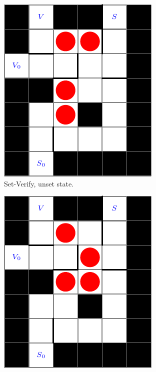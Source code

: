 \documentclass[11pt]{article}
\begin{document}
\begin{figure}[!ht]
  \centering
  \caption{Set-Verify Gadgets}
  \begin{subfigure}[b]{0.3\textwidth}
    \includegraphics[width=\textwidth]{SetVerifyUnset}
    \caption{Set-Verify, unset state.}
    \label{ldeDiagrams}
  \end{subfigure}
  \begin{subfigure}[b]{0.3\textwidth}
    \includegraphics[width=\textwidth]{SetVerifySet}

\end{subfigure}
\end{figure}
\end{document}
